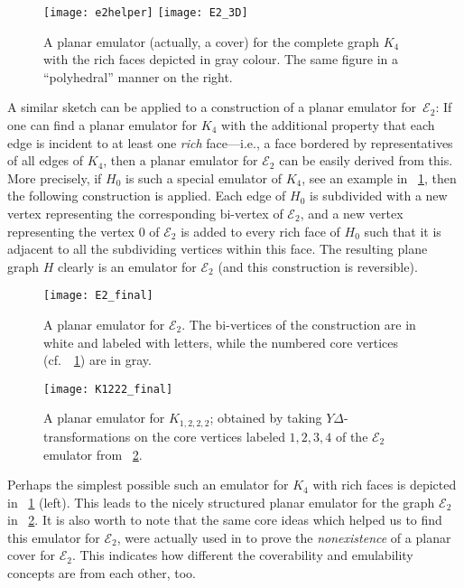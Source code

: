 \documentclass[envcountsect,envcountsame]{llncs}
\newcommand{\KKK}{\ensuremath{K_{1,2,2,2}}\xspace}
\newcommand{\EE}{\ensuremath{\mathcal{E}_2}\xspace}
\begin{document}
\begin{figure}[tb]\centering
\texttt{[image: e2helper]} \qquad\qquad
\texttt{[image: E2\_3D]}
\caption{A planar emulator (actually, a cover) for the complete graph 
	$K_4$ with the rich faces depicted in gray colour. 
	The same figure in a ``polyhedral'' manner on the right.}
\label{fig:e2helper}
\end{figure}


A similar sketch can be applied to a construction of a planar emulator for~\EE:
If one can find a planar emulator for $K_4$ with the additional property
that each edge is incident to at least one \emph{rich} face---i.e., a face
bordered by representatives of all edges of $K_4$,
then a planar emulator for \EE can be easily derived from this.
More precisely, if $H_0$ is such a special emulator of $K_4$,
see an example in \figurename~\ref{fig:e2helper},
then the following construction is applied.
Each edge of $H_0$ is subdivided with a new vertex representing the
corresponding bi-vertex of \EE,
and a new vertex representing the vertex $0$ of \EE is added to every rich
face of $H_0$ such that it is adjacent to all the 
subdividing vertices within this face.
The resulting plane graph $H$ clearly is an emulator for \EE
(and this construction is reversible).

\begin{figure}[tb]\centering
\texttt{[image: E2\_final]}
\caption{A planar emulator for \EE.
	The bi-vertices of the construction are in white and labeled with
	letters, while the numbered core vertices 
	 (cf.~\figurename~\ref{fig:e2helper}) are in gray.}
\label{fig:e2_final}
\end{figure}

\begin{figure}[htbp]\centering
\texttt{[image: K1222\_final]}
\caption{A planar emulator for \KKK; 
	obtained by taking {\ensuremath{Y\!\Delta}}-transformations on
	the core vertices labeled $1,2,3,4$ of the \EE emulator from
	\figurename~\ref{fig:e2_final}.}
\label{fig:K1222emul}\label{fig:k1222_final}
\end{figure}



Perhaps the simplest possible such an emulator for $K_4$ with rich faces is
depicted in \figurename~\ref{fig:e2helper} (left).
This leads to the nicely structured planar emulator for the graph \EE in
\figurename~\ref{fig:e2_final}.
It is also worth to note that the same core ideas which helped us to find
this emulator for \EE, were actually used in \cite{cit:c4e2} to prove the
{\em nonexistence} of a planar cover for \EE.
This indicates how different the coverability and emulability concepts are
from each other, too.
\end{document}
